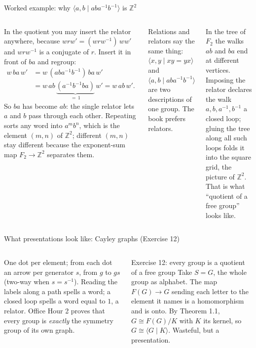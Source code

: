 \documentclass[aspectratio=169,10pt]{beamer}
\newcommand{\Z}{\mathbb{Z}}
\newcommand{\inv}{^{-1}}
\begin{document}
\begin{frame}{Worked example: why $\langle a,b\mid aba\inv b\inv\rangle$ is $\Z^2$}
\begin{columns}[T]
\small In the quotient you may insert the relator anywhere, because $wrw'=(wrw\inv)\,ww'$ and $wrw\inv$ is a conjugate of $r$. Insert it in front of $ba$ and regroup:
\begin{align*}
w\,ba\,w' &= w\,(aba\inv b\inv)\,ba\,w'\\
&= w\,ab\,\underbrace{(a\inv b\inv b a)}_{=\,1}\,w' = w\,ab\,w'.
\end{align*}
So $ba$ has become $ab$: the single relator lets $a$ and $b$ pass through each other. Repeating sorts any word into $a^mb^n$, which is the element $(m,n)$ of $\Z^2$; different $(m,n)$ stay different because the exponent-sum map $F_2\to\Z^2$ separates them.
\vspace{4pt}

Relations and relators say the same thing: $\langle x,y\mid xy=yx\rangle$ and $\langle a,b\mid aba\inv b\inv\rangle$ are two descriptions of one group. The book prefers relators.
\centering\scalebox{0.58}{\figabba}
\begin{bigbox}
In the tree of $F_2$ the walks $ab$ and $ba$ end at different vertices. Imposing the relator declares the walk $a,b,a\inv,b\inv$ a closed loop; gluing the tree along all such loops folds it into the square grid, the picture of $\Z^2$. That is what ``quotient of a free group'' looks like.
\end{bigbox}
\end{columns}
\end{frame}

\begin{frame}{What presentations look like: Cayley graphs (Exercise 12)}
\begin{center}\scalebox{0.5}{\figcayleygallery}\end{center}
\begin{columns}[T]
One dot per element; from each dot an arrow per generator $s$, from $g$ to $gs$ (two-way when $s=s\inv$). Reading the labels along a path spells a word; a closed loop spells a word equal to $1$, a relator. Office Hour 2 proves that every group is \emph{exactly} the symmetry group of its own graph.
\begin{exbox}{Exercise 12: every group is a quotient of a free group}
Take $S=G$, the whole group as alphabet. The map $F(G)\to G$ sending each letter to the element it names is a homomorphism and is onto. By Theorem 1.1, $G\cong F(G)/K$ with $K$ its kernel, so $G\cong\langle G\mid K\rangle$. Wasteful, but a presentation.
\end{exbox}
\end{columns}
\end{frame}
\end{document}
